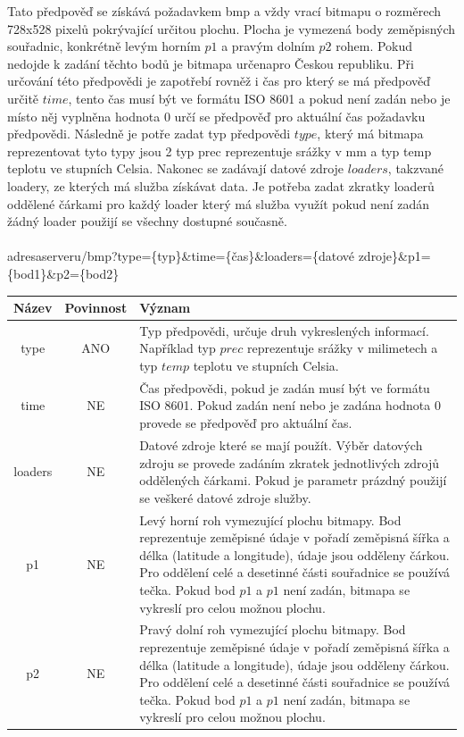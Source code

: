 \documentclass[czech,bachelor,dept460,male,csharp,cpdeclaration]{diploma}
\begin{document}
	Tato předpověď se získává požadavkem bmp a vždy vrací bitmapu o rozměrech 728x528 pixelů pokrývající určitou plochu. Plocha je vymezená body zeměpisných souřadnic, konkrétně levým horním $p1$ a pravým dolním $p2$ rohem. Pokud nedojde k zadání těchto bodů je bitmapa určenapro Českou republiku. Při určování této předpovědi je zapotřebí rovněž i čas pro který se má předpověď určitě $time$, tento čas musí být ve formátu ISO 8601 a pokud není zadán nebo je místo něj vyplněna hodnota 0 určí se předpověď pro aktuální čas požadavku předpovědi. Následně je potře zadat typ předpovědi $type$, který má bitmapa reprezentovat tyto typy jsou 2 typ prec reprezentuje srážky v mm a typ temp teplotu ve stupních Celsia. Nakonec se zadávají datové zdroje $loaders$, takzvané loadery, ze kterých má služba získávat data. Je potřeba zadat zkratky loaderů oddělené čárkami pro každý loader který má služba využít pokud není zadán žádný loader použijí se všechny dostupné současně.
	\\\\
	adresaserveru/bmp?type=\{typ\}\&time=\{čas\}\&loaders=\{datové zdroje\}\&p1=\{bod1\}\&p2=\{bod2\}
	
	\begin{center}
		
		
		\begin{tabular}{c c p{13cm}}
			Název & Povinnost & Význam \\
			\midrule
			type & ANO & Typ předpovědi, určuje druh vykreslených informací. Například typ $prec$ reprezentuje srážky v milimetech a typ $temp$ teplotu ve stupních Celsia.\\ 
   			time & NE & Čas předpovědi, pokud je zadán musí být ve formátu ISO 8601. Pokud zadán není nebo je zadána hodnota 0  provede se předpověď pro aktuální čas.\\ 
   			loaders & NE & Datové zdroje které se mají použít. Výběr datových zdroju se provede zadáním zkratek jednotlivých zdrojů oddělených čárkami. Pokud je parametr prázdný použijí se veškeré datové zdroje služby. \\ 
   			p1 & NE & Levý horní roh vymezující plochu bitmapy. Bod reprezentuje zeměpisné údaje v pořadí zeměpisná šířka a délka (latitude a longitude), údaje jsou odděleny čárkou. Pro oddělení celé a desetinné části souřadnice se používá tečka. Pokud bod $p1$ a $p1$ není zadán, bitmapa se vykreslí pro celou možnou plochu.\\
   			p2 & NE & Pravý dolní roh vymezující plochu bitmapy. Bod reprezentuje zeměpisné údaje v pořadí zeměpisná šířka a délka (latitude a longitude), údaje jsou odděleny čárkou. Pro oddělení celé a desetinné části souřadnice se používá tečka. Pokud bod $p1$ a $p1$ není zadán, bitmapa se vykreslí pro celou možnou plochu.\\
		\end{tabular}
	\end{center}
	
\end{document}
